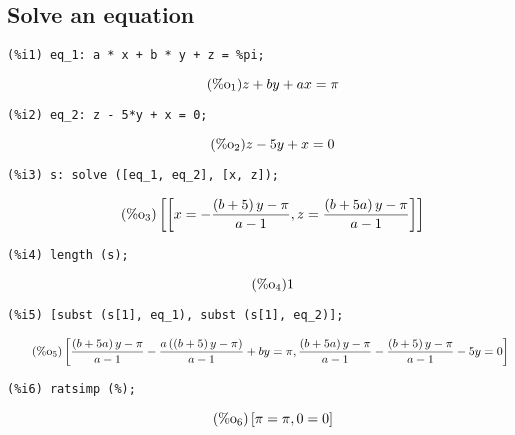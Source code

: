 \documentclass[12pt,leqno]{article}
\begin{document}
\subsection{Solve an equation}
\begin{verbatim}
(%i1) eq_1: a * x + b * y + z = %pi;
\end{verbatim}
\begin{equation}
\tag{$\mathop{\mathrm{\%o}_{1}}$}z+b y+a x = \pi
\label{eq:doc-group1-code28-1-1}
\end{equation}
\begin{verbatim}
(%i2) eq_2: z - 5*y + x = 0;
\end{verbatim}
\begin{equation}
\tag{$\mathop{\mathrm{\%o}_{2}}$}z-5 y+x = 0
\label{eq:doc-group1-code28-2-1}
\end{equation}
\begin{verbatim}
(%i3) s: solve ([eq_1, eq_2], [x, z]);
\end{verbatim}
\begin{equation}
\tag{$\mathop{\mathrm{\%o}_{3}}$}\left[\left[x = -\frac{\left(b+5\right) y-\pi}{a-1}, z = \frac{\left(b+5 a\right) y-\pi}{a-1}\right]\right]
\label{eq:doc-group1-code28-3-1}
\end{equation}
\begin{verbatim}
(%i4) length (s);
\end{verbatim}
\begin{equation}
\tag{$\mathop{\mathrm{\%o}_{4}}$}1
\label{eq:doc-group1-code28-4-1}
\end{equation}
\begin{verbatim}
(%i5) [subst (s[1], eq_1), subst (s[1], eq_2)];
\end{verbatim}
\begin{equation}
\tag{$\mathop{\mathrm{\%o}_{5}}$}\left[\frac{\left(b+5 a\right) y-\pi}{a-1}-\frac{a \left(\left(b+5\right) y-\pi\right)}{a-1}+b y = \pi, \frac{\left(b+5 a\right) y-\pi}{a-1}-\frac{\left(b+5\right) y-\pi}{a-1}-5 y = 0\right]
\label{eq:doc-group1-code28-5-1}
\end{equation}
\begin{verbatim}
(%i6) ratsimp (%);
\end{verbatim}
\begin{equation}
\tag{$\mathop{\mathrm{\%o}_{6}}$}\left[\pi = \pi, 0 = 0\right]
\label{eq:doc-group1-code28-6-1}
\end{equation}
\end{document}
